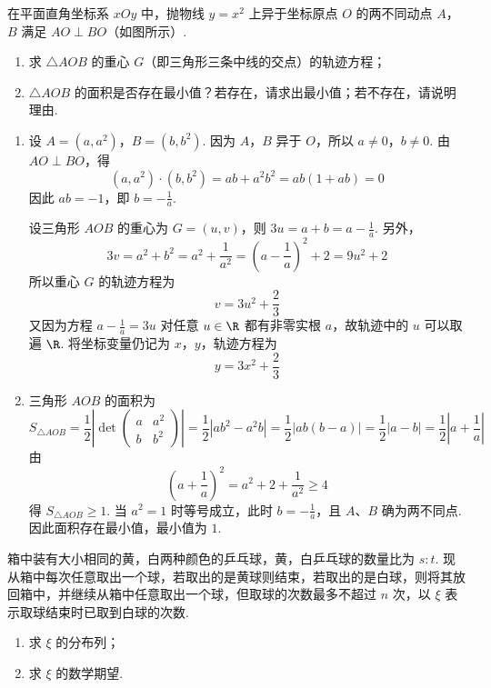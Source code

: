 \begin{problem}
在平面直角坐标系 \(xOy\) 中，抛物线 \(y = x^2\) 上异于坐标原点 \(O\) 的两不同动点 \(A\)，\(B\) 满足 \(AO \perp BO\)（如图所示）.

\begin{enumerate}
\item 求 \(\triangle AOB\) 的重心 \(G\)（即三角形三条中线的交点）的轨迹方程；
\item \(\triangle AOB\) 的面积是否存在最小值？若存在，请求出最小值；若不存在，请说明理由.
\end{enumerate}

\end{problem}

\begin{solution}
\begin{enumerate}
\item
设 \(A=(a,a^2)\)，\(B=(b,b^2)\). 因为 \(A\)，\(B\) 异于 \(O\)，所以 \(a\ne0\)，\(b\ne0\). 由 \(AO\perp BO\)，得
\[
(a,a^2)\cdot(b,b^2)=ab+a^2b^2=ab(1+ab)=0
\]
因此 \(ab=-1\)，即 \(b=-\frac1a\).

设三角形 \(AOB\) 的重心为 \(G=(u,v)\)，则
\(3u=a+b=a-\frac1a\). 另外，
\[
3v=a^2+b^2=a^2+\frac1{a^2}=\left(a-\frac1a\right)^2+2=9u^2+2
\]
所以重心 \(G\) 的轨迹方程为
\[
v=3u^2+\frac23
\]
又因为方程 \(a-\frac1a=3u\) 对任意 \(u\in\R\) 都有非零实根 \(a\)，故轨迹中的 \(u\) 可以取遍 \(\R\). 将坐标变量仍记为 \(x\)，\(y\)，轨迹方程为
\[
y=3x^2+\frac23
\]

\item
三角形 \(AOB\) 的面积为
\[
S_{\triangle AOB}=\frac12\left|\det\begin{pmatrix}a&a^2\\b&b^2\end{pmatrix}\right|
 =\frac12|ab^2-a^2b|
 =\frac12|ab(b-a)|
 =\frac12|a-b|
 =\frac12\left|a+\frac1a\right|
\]
由
\[
\left(a+\frac1a\right)^2=a^2+2+\frac1{a^2}\geqslant4
\]
得 \(S_{\triangle AOB}\geqslant1\). 当 \(a^2=1\) 时等号成立，此时 \(b=-\frac1a\)，且 \(A\)、\(B\) 确为两不同点. 因此面积存在最小值，最小值为 \(1\).
\end{enumerate}
\end{solution}

\begin{problem}
箱中装有大小相同的黄，白两种颜色的乒乓球，黄，白乒乓球的数量比为 \(s:t\). 现从箱中每次任意取出一个球，若取出的是黄球则结束，若取出的是白球，则将其放回箱中，并继续从箱中任意取出一个球，但取球的次数最多不超过 \(n\) 次，以 \(\xi\) 表示取球结束时已取到白球的次数.
\begin{enumerate}
\item 求 \(\xi\) 的分布列；
\item 求 \(\xi\) 的数学期望.
\end{enumerate}
\end{problem}

